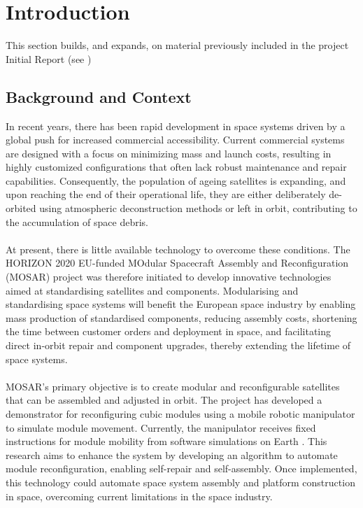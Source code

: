 \section{Introduction}
This section builds, and expands, on material previously included in the project Initial Report (see )
\subsection{Background and Context}
In recent years, there has been rapid development in space systems driven by a global push for increased commercial accessibility. Current commercial systems are designed with a focus on minimizing mass and launch costs, resulting in highly customized configurations that often lack robust maintenance and repair capabilities. Consequently, the population of ageing satellites is expanding, and upon reaching the end of their operational life, they are either deliberately de-orbited using atmospheric deconstruction methods or left in orbit, contributing to the accumulation of space debris.
\\\\
At present, there is little available technology to overcome these conditions. The HORIZON 2020 EU-funded MOdular Spacecraft Assembly and Reconfiguration (MOSAR) project \cite{MOSAR} was therefore initiated to develop innovative technologies aimed at standardising satellites and components. Modularising and standardising space systems will benefit the European space industry by enabling mass production of standardised components, reducing assembly costs, shortening the time between customer orders and deployment in space, and facilitating direct in-orbit repair and component upgrades, thereby extending the lifetime of space systems.
\\\\
MOSAR’s primary objective is to create modular and reconfigurable satellites that can be assembled and adjusted in orbit. The project has developed a demonstrator for reconfiguring cubic modules using a mobile robotic manipulator to simulate module movement. Currently, the manipulator receives fixed instructions for module mobility from software simulations on Earth \cite{MOSARDesign}. This research aims to enhance the system by developing an algorithm to automate module reconfiguration, enabling self-repair and self-assembly. Once implemented, this technology could automate space system assembly and platform construction in space, overcoming current limitations in the space industry.

